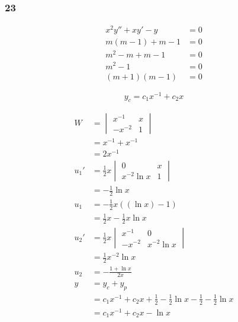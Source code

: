 \documentclass{article}
\begin{document}
\subsubsection{23}

\begin{align*}
  x^2 y'' + x y' - y & = 0 \\
  m (m - 1) + m - 1  & = 0 \\
  m^2 - m + m - 1    & = 0 \\
  m^2 - 1            & = 0 \\
  (m + 1) (m - 1)    & = 0
\end{align*}

\[y_c = c_1 x^{-1} + c_2 x\]

\begin{align*}
  W    & = \begin{vmatrix}
             x^{-1}  & x \\
             -x^{-2} & 1
           \end{vmatrix}                                                                         \\
       & = x^{-1} + x^{-1}                                                                        \\
       & = 2x^{-1}                                                                                \\
  u_1' & = \frac{1}{2} x \begin{vmatrix}
                           0            & x \\
                           x^{-2} \ln x & 1
                         \end{vmatrix}                                                         \\
       & = -\frac{1}{2} \ln x                                                                     \\
  u_1  & = -\frac{1}{2} x ((\ln x) - 1)                                                           \\
       & = \frac{1}{2} x - \frac{1}{2} x \ln x                                                    \\
  u_2' & = \frac{1}{2} x \begin{vmatrix}
                           x^{-1}  & 0            \\
                           -x^{-2} & x^{-2} \ln x
                         \end{vmatrix}                                                   \\
       & = \frac{1}{2} x^{-2} \ln x                                                               \\
  u_2  & = -\frac{1 + \ln x}{2x}                                                                  \\
  y    & = y_c + y_p                                                                              \\
       & = c_1 x^{-1} + c_2 x + \frac{1}{2} - \frac{1}{2} \ln x - \frac{1}{2} - \frac{1}{2} \ln x \\
       & = c_1 x^{-1} + c_2 x - \ln x
\end{align*}
\end{document}
